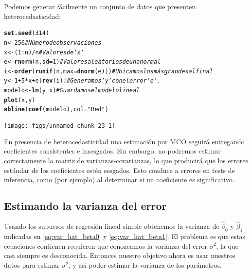 \documentclass{report}\usepackage[]{graphicx}\usepackage[]{color}
\makeatletter
\newcommand{\hlnum}[1]{\textcolor[rgb]{0.686,0.059,0.569}{#1}}%
\newcommand{\hlstr}[1]{\textcolor[rgb]{0.192,0.494,0.8}{#1}}%
\newcommand{\hlcom}[1]{\textcolor[rgb]{0.678,0.584,0.686}{\textit{#1}}}%
\newcommand{\hlopt}[1]{\textcolor[rgb]{0,0,0}{#1}}%
\newcommand{\hlstd}[1]{\textcolor[rgb]{0.345,0.345,0.345}{#1}}%
\newcommand{\hlkwb}[1]{\textcolor[rgb]{0.69,0.353,0.396}{#1}}%
\newcommand{\hlkwc}[1]{\textcolor[rgb]{0.333,0.667,0.333}{#1}}%
\newcommand{\hlkwd}[1]{\textcolor[rgb]{0.737,0.353,0.396}{\textbf{#1}}}%
\newenvironment{kframe}{%
 \def\at@end@of@kframe{}%
 \ifinner\ifhmode%
  \def\at@end@of@kframe{\end{minipage}}%
  \begin{minipage}{\columnwidth}%
 \fi\fi%
 \def\FrameCommand##1{\hskip\@totalleftmargin \hskip-\fboxsep
 \colorbox{shadecolor}{##1}\hskip-\fboxsep
     \hskip-\linewidth \hskip-\@totalleftmargin \hskip\columnwidth}%
 \MakeFramed {\advance\hsize-\width
   \@totalleftmargin\z@ \linewidth\hsize
   \@setminipage}}%
 {\par\unskip\endMakeFramed%
 \at@end@of@kframe}
\newenvironment{knitrout}{}{} %
\makeatother
\begin{document}
Podemos generar fácilmente un conjunto de datos que presenten heterocedasticidad:

\begin{knitrout}
\color{fgcolor}\begin{kframe}
\begin{alltt}
\hlkwd{set.seed}\hlstd{(}\hlnum{314}\hlstd{)}
\hlstd{n} \hlkwb{<-} \hlnum{256}                           \hlcom{# Número de observaciones}
\hlstd{x} \hlkwb{<-} \hlstd{(}\hlnum{1}\hlopt{:}\hlstd{n)}\hlopt{/}\hlstd{n}                       \hlcom{# Valores de `x`}
\hlstd{e} \hlkwb{<-} \hlkwd{rnorm}\hlstd{(n,} \hlkwc{sd}\hlstd{=}\hlnum{1}\hlstd{)}                \hlcom{# Valores aleatorios de una normal}
\hlstd{i} \hlkwb{<-} \hlkwd{order}\hlstd{(}\hlkwd{runif}\hlstd{(n,} \hlkwc{max}\hlstd{=}\hlkwd{dnorm}\hlstd{(e)))} \hlcom{# Ubicamos los más grandes al final}
\hlstd{y} \hlkwb{<-} \hlnum{1} \hlopt{+} \hlnum{5} \hlopt{*} \hlstd{x} \hlopt{+} \hlstd{e[}\hlkwd{rev}\hlstd{(i)]}         \hlcom{# Generamos `y` con el error `e`.}
\hlstd{modelo} \hlkwb{<-} \hlkwd{lm}\hlstd{(y} \hlopt{~} \hlstd{x)}                \hlcom{# Guardamos el modelo lineal}
\hlkwd{plot}\hlstd{(x, y)}
\hlkwd{abline}\hlstd{(}\hlkwd{coef}\hlstd{(modelo),} \hlkwc{col} \hlstd{=} \hlstr{"Red"}\hlstd{)}
\end{alltt}
\end{kframe}

{\centering \texttt{[image: figs/unnamed-chunk-23-1]} 

}



\end{knitrout}

En presencia de heterocedasticidad una estimación por MCO seguirá entregando coeficientes consistentes e insesgados. Sin embargo, no podremos estimar correctamente la matriz de varianzas-covarianzas, lo que producirá que los errores estándar de los coeficientes estén sesgados. Esto conduce a errores en tests de inferencia, como (por ejemplo) al determinar si un coeficiente es significativo.

\subsection{Estimando la varianza del error}

Usando los supuesos de regresión lineal simple obtenemos la varianza de $\hat\beta_0$ y $\hat\beta_1$ indicadas en \eqref{eq:var_hat_beta0} y \eqref{eq:var_hat_beta1}.
El problema es que estas ecuaciones contienen requieren que conozcamos la varianza del error $\sigma^2$, la que casi siempre es desconocida.
Entonces nuestro objetivo ahora es usar nuestros datos para estimar $\sigma^2$, y así poder estimar la varianza de los parámetros.
\end{document}
